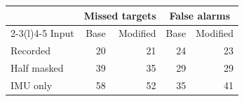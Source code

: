 \begin{tabular}{@{}lrrrr@{}}\toprule
&\multicolumn{2}{c}{Missed targets}&\multicolumn{2}{c}{False alarms}\\
\cmidrule(lr){2-3}\cmidrule(l){4-5}
Input & Base & Modified & Base & Modified \\\midrule
Recorded & 20 & 21 & 24 & 23\\
Half masked & 39 & 35 & 29 & 29\\
IMU only & 58 & 52 & 35 & 41\\\bottomrule
\end{tabular}
